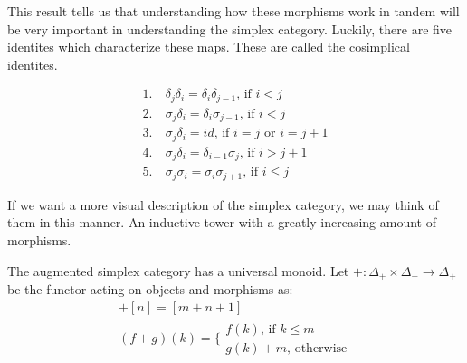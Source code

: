 \documentclass[../thesis.tex]{subfiles}
\begin{document}
        This result tells us that understanding how these morphisms work in tandem will be very important in understanding the simplex category. Luckily, there are five identites which characterize these maps. These are called the cosimplical identites.

        \begin{align*}
            1.&\ \delta_j\delta_i = \delta_i\delta_{j-1} \text{, if }i<j \\
            2.&\ \sigma_j\delta_i = \delta_i\sigma_{j-1} \text{, if }i<j \\
            3.&\ \sigma_j\delta_i = id \text{, if }i=j\text{ or }i=j+1 \\
            4.&\ \sigma_j\delta_i = \delta_{i-1}\sigma_j \text{, if }i>j+1 \\
            5.&\ \sigma_j\sigma_i = \sigma_i\sigma_{j+1} \text{, if }i\leq j
        \end{align*}
        
        If we want a more visual description of the simplex category, we may think of them in this manner. An inductive tower with a greatly increasing amount of morphisms. 
        \begin{center}

        \end{center}

        The augmented simplex category has a universal monoid. Let $+:\Delta_+ \times \Delta_+ \rightarrow \Delta_+$ be the functor acting on objects and morphisms as:
        \begin{align*}
            [m]+[n] = [m+n+1] \\
            (f+g)(k) = \biggl\{\substack{f(k)\text{, if }k\leq m \\ g(k)+m\text{, otherwise}}
        \end{align*}
\end{document}
